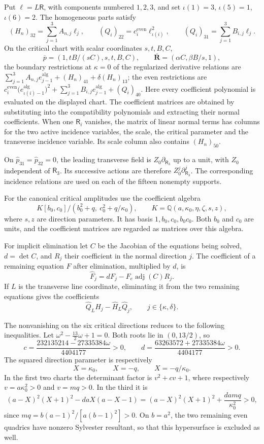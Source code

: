 \documentclass[11pt,a4paper]{article}
\numberwithin{equation}{section}
\theoremstyle{plain}
\theoremstyle{definition}
\theoremstyle{remark}
\begin{document}
Put $\ell=L\mathsf R$, with components numbered $1,2,3$, and
set $\iota(1)=3$, $\iota(5)=1$, $\iota(6)=2$. The homogeneous parts satisfy
\[
 (H_n)_{32}=\sum_{j=1}^3 A_{n,j}\ell_j,\qquad
 (Q_i)_{22}=c_i^{\mathrm{even}}\ell_{\iota(i)}^2,\qquad
 (Q_i)_{31}=\sum_{j=1}^3B_{i,j}\ell_j.
\]
On the critical chart with scalar coordinates $s,t,B,C$,
\[
 \overline p=(1,tB/(sC),s,t,B,C),\qquad
 \overline{\boldsymbol R}=(\alpha C,\beta B/s,1),
\]
the boundary restrictions at $\kappa=0$ of the regularized derivative
relations are $\sum_{j=1}^3A_{n,j}e_{j-1}^{\mathrm{alg}}+(H_n)_{41}+\delta(H_n)_{13}$;
the even restrictions are
$c_i^{\mathrm{even}}\bigl(e_{\iota(i)-1}^{\mathrm{alg}}\bigr)^2+\sum_{j=1}^3B_{i,j}e_{j-1}^{\mathrm{alg}}+(Q_i)_{40}$.
Here every coefficient polynomial is evaluated on the displayed chart.
The coefficient matrices are obtained by substituting into the
compatibility polynomials and extracting their normal coefficients. When one $\mathsf R_i$ vanishes,
the matrix of linear normal terms has columns for the two active incidence
variables, the scale, the critical parameter and the transverse
incidence variable. Its scale column also contains $(H_n)_{50}$.

On $\widehat p_{31}=\widehat p_{32}=0$, the leading transverse
field is $Z_0\partial_{\mathsf R_3}$ up to a unit, with $Z_0$
independent of $\mathsf R_3$. Its successive actions are therefore
$Z_0^j\partial_{\mathsf R_3}^j$. The corresponding incidence relations
are used on each of the fifteen nonempty supports.

For the canonical critical amplitudes use the coefficient algebra
\[
 K[b_0,c_0]/(b_0^2+q,\ c_0^2+q/\kappa_0),\qquad
 K=\mathbb Q(a,\kappa_0,\eta,\zeta,s,z),
\]
where $s,z$ are direction parameters. It has basis $1,b_0,c_0,b_0c_0$.
Both $b_0$ and $c_0$ are units, and the coefficient matrices are
regarded as matrices over this algebra.

For implicit elimination let $C$ be the Jacobian of the equations
being solved, $d=\det C$, and $R_j$ their coefficient in the normal
direction $j$. The coefficient of a remaining equation $F$ after
elimination, multiplied by $d$, is
\[
 \widehat F_j=dF_j-F_e\operatorname{adj}(C)R_j.
\]
If $L$ is the transverse line coordinate, eliminating it from the
two remaining equations gives the coefficients
\[
 \widehat Q_L\widehat H_j-\widehat H_L\widehat Q_j,
 \qquad j\in\{\kappa,\delta\}.
\]

The nonvanishing on the six critical directions reduces to the
following inequalities. Let $\omega^2-\tfrac{13}{2}\omega+1=0$.
Both roots lie in $(0,13/2)$, so
\[
 c=\frac{232135214-27335384\omega}{4404177}>0,\qquad
 d=\frac{63263572+27335384\omega}{4404177}>0.
\]
The squared direction parameter is respectively
\[
 X=\kappa_0,\qquad X=-q,\qquad X=-q/\kappa_0.
\]
In the first two charts the determinant factor is $v^2+cv+1$,
where respectively $v=a\kappa_0^2>0$ and $v=mq>0$.
In the third it is
\[
 (a-X)^2(X+1)^2-daX(a-X-1)
  =(a-X)^2(X+1)^2+\frac{damq}{\kappa_0^2}>0,
\]
since $mq=b(a-1)^2/[a(b-1)^2]>0$.
On $b=a^2$, the two remaining even quadrics have nonzero
Sylvester resultant, so that this hypersurface is excluded as well.
\end{document}
